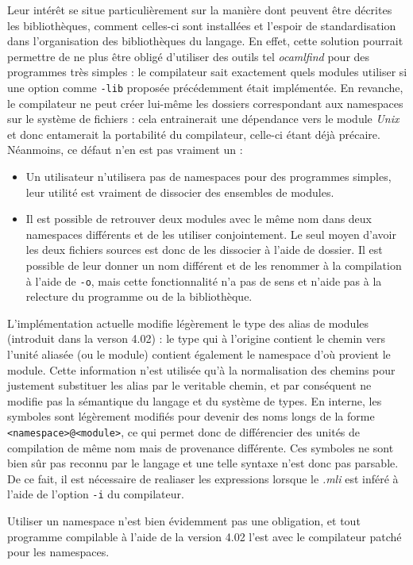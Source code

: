 \documentclass[11pt,a4paper]{report}
\begin{document}
Leur intérêt se situe particulièrement sur la manière dont peuvent être décrites
les bibliothèques, comment celles-ci sont installées et l'espoir de
standardisation dans l'organisation des bibliothèques du langage. En effet,
cette solution pourrait permettre de ne plus être obligé d'utiliser des outils
tel \emph{ocamlfind} pour des programmes très simples : le compilateur sait
exactement quels modules utiliser si une option comme \texttt{-lib} proposée
précédemment était implémentée. En revanche, le compilateur ne peut créer
lui-même les dossiers correspondant aux namespaces sur le système de fichiers :
cela entrainerait une dépendance vers le module \emph{Unix} et donc entamerait
la portabilité du compilateur, celle-ci étant déjà précaire. Néanmoins, ce
défaut n'en est pas vraiment un :
\begin{itemize}
\item Un utilisateur n'utilisera pas de namespaces pour des programmes simples,
  leur utilité est vraiment de dissocier des ensembles de modules.
\item Il est possible de retrouver deux modules avec le même nom dans deux
  namespaces différents et de les utiliser conjointement. Le seul moyen d'avoir
  les deux fichiers sources est donc de les dissocier à l'aide de dossier. Il
  est possible de leur donner un nom différent et de les renommer à la
  compilation à l'aide de \texttt{-o}, mais cette fonctionnalité n'a pas de sens
  et n'aide pas à la relecture du programme ou de la bibliothèque.
\end{itemize}

L'implémentation actuelle modifie légèrement le type des alias de modules
(introduit dans la verson 4.02) : le type qui à l'origine contient le chemin
vers l'unité aliasée (ou le module) contient également le namespace d'où
provient le module. Cette information n'est utilisée qu'à la normalisation des
chemins pour justement substituer les alias par le veritable chemin, et par
conséquent ne modifie pas la sémantique du langage et du système de types.
En interne, les symboles sont légèrement modifiés pour devenir des noms longs de
la forme \texttt{<namespace>@<module>}, ce qui permet donc de différencier des
unités de compilation de même nom mais de provenance différente. Ces symboles ne
sont bien sûr pas reconnu par le langage et une telle syntaxe n'est donc pas
parsable. De ce fait, il est nécessaire de realiaser les expressions lorsque le
\emph{.mli} est inféré à l'aide de l'option \texttt{-i} du compilateur.

Utiliser un namespace n'est bien évidemment pas une obligation, et tout
programme compilable à l'aide de la version 4.02 l'est avec le compilateur
patché pour les namespaces.
\end{document}
